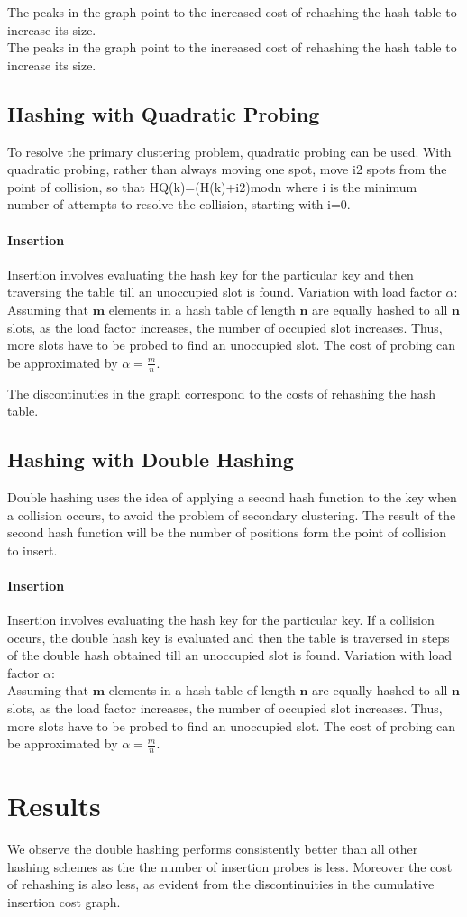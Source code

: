 \documentclass[12pt]{article}
\begin{document}
The peaks in the graph point to the increased cost of rehashing the hash table to increase its size.\\

The peaks in the graph point to the increased cost of rehashing the hash table to increase its size.\\

\subsection{Hashing with Quadratic Probing}\label{Hashing with Quadratic Probing}
To resolve the primary clustering problem, quadratic probing can be used. With quadratic probing, rather than always moving one spot, move i2 spots from the point of collision, so that HQ(k)=(H(k)+i2)modn where i is the minimum number of attempts to resolve the collision, starting with i=0.
\paragraph{Insertion}
Insertion involves evaluating the hash key for the particular key and then traversing the table till an unoccupied slot is found.
Variation with load factor $\alpha$:\\
Assuming that $\mathbf{m}$ elements in a hash table of length $\mathbf{n}$ are equally hashed to all $\mathbf{n}$ slots, as the load factor increases, the number of occupied slot increases. Thus, more slots have to be probed to find an unoccupied slot. The cost of probing can be approximated by $\alpha=\frac{m}{n}$. 

The discontinuties in the graph correspond to the costs of rehashing the hash table.\\

\subsection{Hashing with Double Hashing}\label{Hashing with Double Hashing}
Double hashing uses the idea of applying a second hash function to the key when a collision occurs, to avoid the problem of secondary clustering. The result of the second hash function will be the number of positions form the point of collision to insert.
\paragraph{Insertion}
Insertion involves evaluating the hash key for the particular key. If a collision occurs, the double hash key is evaluated and then the table is traversed in steps of the double hash obtained till an unoccupied slot is found.
Variation with load factor $\alpha$:\\
Assuming that $\mathbf{m}$ elements in a hash table of length $\mathbf{n}$ are equally hashed to all $\mathbf{n}$ slots, as the load factor increases, the number of occupied slot increases. Thus, more slots have to be probed to find an unoccupied slot. The cost of probing can be approximated by $\alpha=\frac{m}{n}$. 

\section{Results}\label{results}
We observe the double hashing performs consistently better than all other hashing schemes as the the number of insertion probes is less. Moreover the cost of rehashing is also less, as evident from the discontinuities in the cumulative insertion cost graph.
\end{document}
